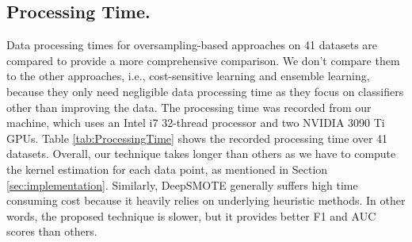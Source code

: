 \subsection{Processing Time.}
\label{sec:processingTime}
Data processing times for oversampling-based approaches on 41 datasets are compared to provide a more comprehensive comparison. We don't compare them to the other approaches, i.e., cost-sensitive learning and ensemble learning, because they only need negligible data processing time as they focus on classifiers other than improving the data. The processing time was recorded from our machine, which uses an Intel i7 32-thread processor and two NVIDIA 3090 Ti GPUs. 
Table \ref{tab:ProcessingTime} shows the recorded processing time over 41 datasets. Overall, our technique takes longer than others as we have to compute the kernel estimation for each data point, as mentioned in Section \ref{sec:implementation}. Similarly, DeepSMOTE generally suffers high time consuming cost because it heavily relies on underlying heuristic methods. In other words, the proposed technique is slower, but it provides better F1 and AUC scores than others.

